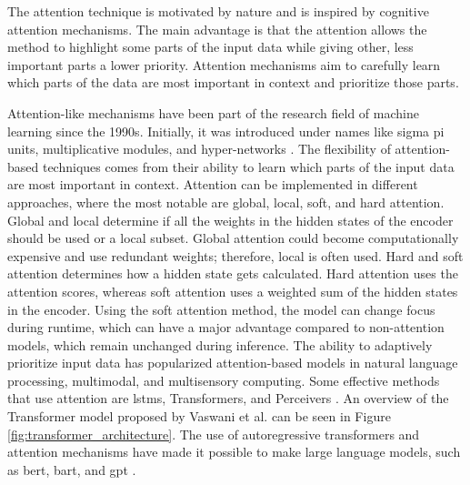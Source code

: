     The attention technique is motivated by nature and is inspired by cognitive attention mechanisms. The main advantage is that the attention allows the method to highlight some parts of the input data while giving other, less important parts a lower priority. Attention mechanisms aim to carefully learn which parts of the data are most important in context and prioritize those parts.



    Attention-like mechanisms have been part of the research field of machine learning since the 1990s. Initially, it was introduced under names like sigma pi units, multiplicative modules, and hyper-networks \cite{lecunRNNsGRUsLSTMs2020}. The flexibility of attention-based techniques comes from their ability to learn which parts of the input data are most important in context. Attention can be implemented in different approaches, where the most notable are global, local, soft, and hard attention. Global and local determine if all the weights in the hidden states of the encoder should be used or a local subset. Global attention could become computationally expensive and use redundant weights; therefore, local is often used. Hard and soft attention determines how a hidden state gets calculated. Hard attention uses the attention scores, whereas soft attention uses a weighted sum of the hidden states in the encoder. Using the soft attention method, the model can change focus during runtime, which can have a major advantage compared to non-attention models, which remain unchanged during inference. The ability to adaptively prioritize input data has popularized attention-based models in natural language processing, multimodal, and multisensory computing. Some effective methods that use attention are \glspl{lstm}, Transformers, and Perceivers \cite{hochreiterLongShorttermMemory1997, vaswaniAttentionAllYou2017, jaeglePerceiverGeneralPerception2021}. An overview of the Transformer model proposed by Vaswani et al. \cite{vaswaniAttentionAllYou2017} can be seen in Figure \ref{fig:transformer_architecture}. The use of autoregressive transformers and attention mechanisms have made it possible to make large language models, such as \gls{bert}, \gls{bart}, and \gls{gpt} \cite{devlinBERTPretrainingDeep2019, lewisBARTDenoisingSequencetoSequence2019, radfordImprovingLanguageUnderstanding2018, radfordLanguageModelsAre2019, brownLanguageModelsAre2020, openaiGPT4TechnicalReport2023}. 


